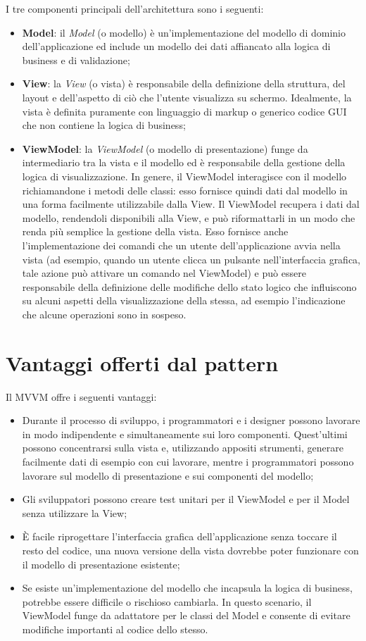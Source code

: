 \documentclass[openany,12pt,a4paper]{report}
\begin{document}
	\noindent I tre componenti principali dell'architettura sono i seguenti:
	\begin{itemize}
		\item \textbf{Model}: il \textit{Model} (o modello) è un'implementazione del modello di dominio dell'applicazione ed include un modello dei dati affiancato alla logica di business e di validazione;
		\item \textbf{View}: la \textit{View} (o vista) è responsabile della definizione della struttura, del layout e dell'aspetto di ciò che l'utente visualizza su schermo. Idealmente, la vista è definita puramente con linguaggio di markup o generico codice GUI che non contiene la logica di business;
		\item \textbf{ViewModel}: la \textit{ViewModel} (o modello di presentazione) funge da intermediario tra la vista e il modello ed è responsabile della gestione della logica di visualizzazione. In genere, il ViewModel interagisce con il modello richiamandone i metodi delle classi: esso fornisce quindi dati dal modello in una forma facilmente utilizzabile dalla View. Il ViewModel recupera i dati dal modello, rendendoli disponibili alla View, e può riformattarli in un modo che renda più semplice la gestione della vista. Esso fornisce anche l'implementazione dei comandi che un utente dell'applicazione avvia nella vista (ad esempio, quando un utente clicca un pulsante nell'interfaccia grafica, tale azione può attivare un comando nel ViewModel) e può essere responsabile della definizione delle modifiche dello stato logico che influiscono su alcuni aspetti della visualizzazione della stessa, ad esempio l'indicazione che alcune operazioni sono in sospeso.
	\end{itemize}

	\section{Vantaggi offerti dal pattern}
	Il MVVM offre i seguenti vantaggi:
	
	\begin{itemize}
		\item Durante il processo di sviluppo, i programmatori e i designer possono lavorare in modo indipendente e simultaneamente sui loro componenti. Quest'ultimi possono concentrarsi sulla vista e, utilizzando appositi strumenti, generare facilmente dati di esempio con cui lavorare, mentre i programmatori possono lavorare sul modello di presentazione e sui componenti del modello;
		\item Gli sviluppatori possono creare test unitari per il ViewModel e per il Model senza utilizzare la View;
		\item È facile riprogettare l'interfaccia grafica dell'applicazione senza toccare il resto del codice, una nuova versione della vista dovrebbe poter funzionare con il modello di presentazione esistente;
		\item Se esiste un'implementazione del modello che incapsula la logica di business, potrebbe essere difficile o rischioso cambiarla. In questo scenario, il ViewModel funge da adattatore per le classi del Model e consente di evitare modifiche importanti al codice dello stesso.	
	\end{itemize}
	
\end{document}
